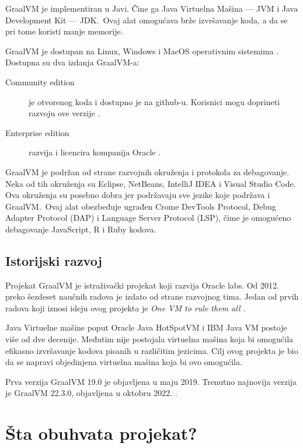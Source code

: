 \documentclass[a4paper]{article}
\begin{document}
GraalVM je implementiran u Javi. Čine ga Java Virtuelna Mašina --- JVM i Java Development Kit --- JDK.\ Ovaj alat omogućava brže izvršavanje koda, a da se pri tome koristi manje memorije.

GraalVM je dostupan na Linux, Windows i MacOS operativnim sistemima \cite{graalvmintroduction}. Dostupna su dva izdanja GraalVM-a:

\begin{description}
	\item [Community edition] je otvorenog koda i dostupno je na github-u. Korisnici mogu doprineti razvoju ove verzije \cite{graalvmCommunity}.
	\item [Enterprise edition] razvija i licencira kompanija Oracle \cite{graalvmEnterprise}.
\end{description}

GraalVM je podržan od strane razvojnih okruženja i protokola za debagovanje. Neka od tih okruženja su Eclipse, NetBeans, IntelliJ IDEA i Visual Studio Code. Ova okruženja su posebno dobra jer podržavaju sve jezike koje podržava i GraalVM.\ Ovaj alat obezbeđuje ugrađen Crome DevTools Protocol, Debug Adapter Protocol (DAP) i Language Server Protocol (LSP), čime je omogućeno debagovanje JavaScript, R i Ruby kodova.

\subsection{Istorijski razvoj}
\label{subsec:istorija}

Projekat GraalVM je istraživački projekat koji razvija Oracle labs. Od 2012. preko šezdeset naučnih radova je izdato od strane razvojnog tima. Jedan od prvih radova koji iznosi ideju ovog projekta je \textit{One VM to rule them all} \cite{onevmtorulethemall}.

Java Virtuelne mašine poput Oracle Java HotSpotVM i IBM Java VM postoje više od dve decenije. Međutim nije postojala virtuelna mašina koja bi omogućila efikasno izvršavanje kodova pisanih u različitim jezicima. Cilj ovog projekta je bio da se napravi objedinjena virtuelna mašina koja bi ovo omogućila.

Prva verzija GraalVM 19.0 je objavljena u maju 2019. Trenutno najnovija verzija je GraalVM 22.3.0, objavljena u oktobru 2022. \cite{graalvmreleases}.

\section{Šta obuhvata projekat?}
\label{sec:projekat}
\end{document}
